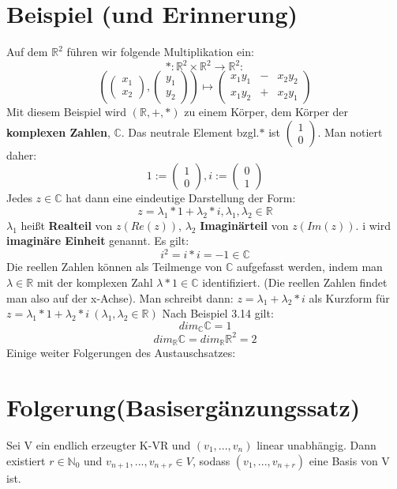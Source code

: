 \documentclass{scrbook}
\begin{document}
\section{Beispiel (und Erinnerung)}
Auf dem $\mathbb{R}^2$ führen wir folgende Multiplikation ein:
\[*:\mathbb{R}^2\times \mathbb{R}^2 \rightarrow \mathbb{R}^2:\]
\[\left(\left(
\begin{array}{c}
x_1\\x_2
\end{array}
\right),\left(
\begin{array}{c}
y_1\\y_2
\end{array}
\right)\right)\mapsto \left(
\begin{array}{ccc}
x_1y_1&-&x_2y_2\\
x_1y_2&+&x_2y_1
\end{array}
\right)\]
Mit diesem Beispiel wird $(\mathbb{R},+,*)$ zu einem Körper, dem Körper der \textbf{komplexen Zahlen}, $\mathbb{C}$. Das neutrale Element bzgl.$*$ ist $\left(
\begin{array}{c}
1\\0
\end{array}
\right)$.
Man notiert daher:
\[
1:=\left(\begin{array}{c}1\\0\end{array}\right), i:= \left(\begin{array}{c}0\\1\end{array}\right)
\]
Jedes $z\in \mathbb{C}$ hat dann eine eindeutige Darstellung der Form:
\[
z=\lambda_1*1+\lambda_2*i, \lambda_1,\lambda_2 \in \mathbb{R}
\]
$\lambda_1$ heißt \textbf{Realteil} von $z (Re(z))$, $\lambda_2$ \textbf{Imaginärteil} von $z (Im(z))$. i wird \textbf{imaginäre Einheit} genannt. Es gilt:
\[
i^2=i*i=-1\in\mathbb{C}
\]
Die reellen Zahlen können als Teilmenge von $\mathbb{C}$ aufgefasst werden, indem man $\lambda \in\mathbb{R}$ mit der komplexen Zahl $\lambda*1\in\mathbb{C}$ identifiziert. (Die reellen Zahlen findet man also auf der x-Achse). Man schreibt dann: $z=\lambda_1+\lambda_2*i$ als Kurzform für $z=\lambda_1*1+\lambda_2*i\ (\lambda_1,\lambda_2\in \mathbb{R})$
Nach Beispiel 3.14 gilt:
\[
dim_{\mathbb{C}}\mathbb{C}=1
\]
\[
dim_{\mathbb{R}}\mathbb{C}=dim_{\mathbb{R}}\mathbb{R}^2=2
\]
Einige weiter Folgerungen des Austauschsatzes:
\section{Folgerung(Basisergänzungssatz)}
Sei V ein endlich erzeugter K-VR und $(v_1,...,v_n)$ linear unabhängig. Dann existiert $r\in\mathbb{N}_0$ und $v_{n+1},...,v_{n+r}\in V$, sodass $(v_1,...,v_{n+r})$ eine Basis von V ist.
\end{document}
